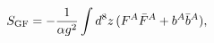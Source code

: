 \begin{equation}\label{fixing}
S_{\rm GF}=-{1\over \alpha g^{2}}\int
d^8z\,(F^{A}\bar{
F}^{A}+b^{A}\bar{b}^{A}),
\end{equation}

